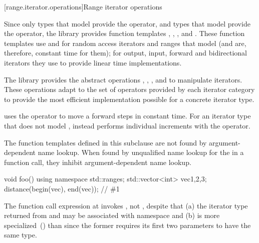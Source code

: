 \begin{addedblock}
[range.iterator.operations]{Range iterator operations}

\pnum
{\color{oldclr}
Since only types that model
 provide the \tcode{+} operator, and
types that model  provide the \tcode{-}
operator, the library provides function templates
, , , and .
These function templates use
\tcode{+}
and
\tcode{-}
for random access iterators and ranges that model 
(and are, therefore, constant time for them); for output, input, forward and
bidirectional iterators they use
\tcode{++}
to provide linear time implementations.
} %

{\color{newclr}
\pnum
The library provides the abstract operations
, , , and 
to manipulate iterators. These operations adapt to the set of operators provided
by each iterator category to provide the most efficient implementation
possible for a concrete iterator type.
\begin{example}
 uses the \tcode{+} operator to move a
 forward  steps in constant time.
For an iterator type that does not model ,
 instead performs  individual increments with
the \tcode{++} operator.
\end{example}
} %

\pnum
The function templates defined in this subclause are not found by
argument-dependent name lookup. When found by
unqualified name lookup for the
 in a function call, they
inhibit argument-dependent name lookup.

\begin{example}
\begin{codeblock}
void foo() {
    using namespace std::ranges;
    std::vector<int> vec{1,2,3};
    distance(begin(vec), end(vec)); // \#1
}
\end{codeblock}
The function call expression at  invokes ,
not , despite that
(a) the iterator type returned from  and 
may be associated with namespace  and
(b)  is more specialized~() than
 since the former requires its first two parameters
to have the same type.
\end{example}


\end{addedblock}
